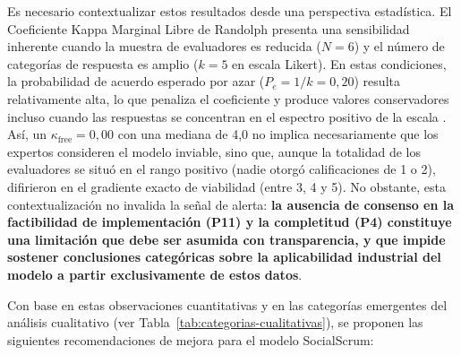 Es necesario contextualizar estos resultados desde una perspectiva estadística. El Coeficiente Kappa Marginal Libre de Randolph \cite{randolph2005} presenta una sensibilidad inherente cuando la muestra de evaluadores es reducida ($N = 6$) y el número de categorías de respuesta es amplio ($k = 5$ en escala Likert). En estas condiciones, la probabilidad de acuerdo esperado por azar ($P_e = 1/k = 0{,}20$) resulta relativamente alta, lo que penaliza el coeficiente y produce valores conservadores incluso cuando las respuestas se concentran en el espectro positivo de la escala \cite{randolph2005}. Así, un $\kappa_{\text{free}} = 0{,}00$ con una mediana de 4,0 no implica necesariamente que los expertos consideren el modelo inviable, sino que, aunque la totalidad de los evaluadores se situó en el rango positivo (nadie otorgó calificaciones de 1 o 2), difirieron en el gradiente exacto de viabilidad (entre 3, 4 y 5). No obstante, esta contextualización no invalida la señal de alerta: \textbf{la ausencia de consenso en la factibilidad de implementación (P11) y la completitud (P4) constituye una limitación que debe ser asumida con transparencia, y que impide sostener conclusiones categóricas sobre la aplicabilidad industrial del modelo a partir exclusivamente de estos datos}.

Con base en estas observaciones cuantitativas y en las categorías emergentes del análisis cualitativo (ver Tabla~\ref{tab:categorias-cualitativas}), se proponen las siguientes recomendaciones de mejora para el modelo SocialScrum:


